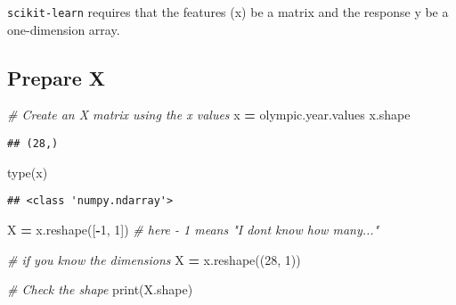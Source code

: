 \documentclass[
]{book}
\newenvironment{Shaded}{\begin{snugshade}}{\end{snugshade}}
\newcommand{\BuiltInTok}[1]{#1}
\newcommand{\CommentTok}[1]{\textcolor[rgb]{0.56,0.35,0.01}{\textit{#1}}}
\newcommand{\DecValTok}[1]{\textcolor[rgb]{0.00,0.00,0.81}{#1}}
\newcommand{\NormalTok}[1]{#1}
\newcommand{\OperatorTok}[1]{\textcolor[rgb]{0.81,0.36,0.00}{\textbf{#1}}}
\begin{document}
{\texttt{scikit-learn} requires that the features (x) be a matrix and the response y be a one-dimension array.}

\hypertarget{prepare-x}{%
\subsection{Prepare X}\label{prepare-x}}

\begin{Shaded}
\begin{Highlighting}[]
\CommentTok{\# Create an X matrix using the x values}
\NormalTok{x }\OperatorTok{=}\NormalTok{ olympic.year.values}
\NormalTok{x.shape}
\end{Highlighting}
\end{Shaded}

\begin{verbatim}
## (28,)
\end{verbatim}

\begin{Shaded}
\begin{Highlighting}[]
\BuiltInTok{type}\NormalTok{(x)}
\end{Highlighting}
\end{Shaded}

\begin{verbatim}
## <class 'numpy.ndarray'>
\end{verbatim}

\begin{Shaded}
\begin{Highlighting}[]
\NormalTok{X }\OperatorTok{=}\NormalTok{ x.reshape([}\OperatorTok{{-}}\DecValTok{1}\NormalTok{, }\DecValTok{1}\NormalTok{]) }\CommentTok{\# here {-} 1 means "I don\textquotesingle{}t know how many..."}
\end{Highlighting}
\end{Shaded}

\begin{Shaded}
\begin{Highlighting}[]
\CommentTok{\# if you know the dimensions}
\NormalTok{X }\OperatorTok{=}\NormalTok{ x.reshape((}\DecValTok{28}\NormalTok{, }\DecValTok{1}\NormalTok{))}
\end{Highlighting}
\end{Shaded}

\begin{Shaded}
\begin{Highlighting}[]
\CommentTok{\# Check the shape}
\BuiltInTok{print}\NormalTok{(X.shape)}
\end{Highlighting}
\end{Shaded}
\end{document}
